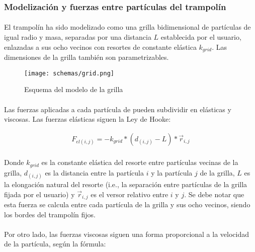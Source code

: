 \documentclass[12pt, twocolumn]{article}
\begin{document}
	\subsubsection{Modelización y fuerzas entre partículas del trampolín}
	
	\paragraph{} El trampolín ha sido modelizado como una grilla bidimensional de partículas de igual radio y masa, separadas por una distancia $L$ establecida por el usuario, enlazadas a sus ocho vecinos con resortes de constante elástica $k_{grid}$. Las dimensiones de la grilla también son parametrizables.
	
    \begin{figure}[H]
		\centering
		\texttt{[image: schemas/grid.png]}
		\caption{Esquema del modelo de la grilla}
		\label{gridschema}
	\end{figure}
	
	\paragraph{} Las fuerzas aplicadas a cada partícula de pueden subdividir en elásticas y viscosas. Las fuerzas elásticas siguen la Ley de Hooke:
	
	\begin{align}
	    F_{el(i,j)} = -k_{grid}*(d_{(i,j)}-L)*\Vec{r}_{i,j}
	\end{align}
	
	\paragraph{} Donde $k_{grid}$ es la constante elástica del resorte entre partículas vecinas de la grilla, $d_{(i,j)}$ es la distancia entre la partícula $i$ y la partícula $j$ de la grilla, $L$ es la elongación natural del resorte (i.e., la separación entre partículas de la grilla fijada por el usuario) y $\Vec{r}_{i,j}$ es el versor relativo entre $i$ y $j$. Se debe notar que esta fuerza se calcula entre cada partícula de la grilla y sus ocho vecinos, siendo los bordes del trampolín fijos. 
	
	\paragraph{} Por otro lado, las fuerzas viscosas siguen una forma proporcional a la velocidad de la partícula, según la fórmula:
	
\end{document}
